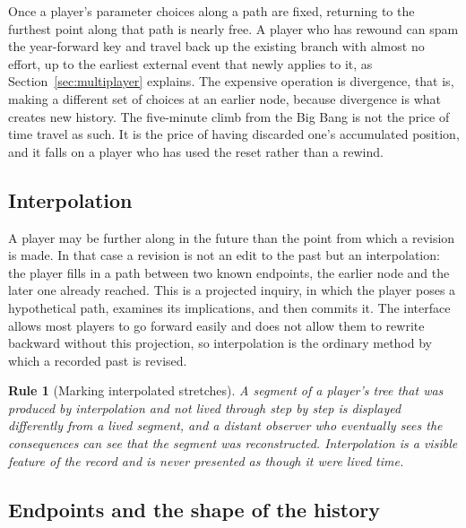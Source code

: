\documentclass[11pt]{article}
\newtheorem{designrule}{Rule}
\begin{document}
Once a player's parameter choices along a path are fixed, returning to the furthest point along that path is nearly free. A player who has rewound can spam the year-forward key and travel back up the existing branch with almost no effort, up to the earliest external event that newly applies to it, as Section~\ref{sec:multiplayer} explains. The expensive operation is divergence, that is, making a different set of choices at an earlier node, because divergence is what creates new history. The five-minute climb from the Big Bang is not the price of time travel as such. It is the price of having discarded one's accumulated position, and it falls on a player who has used the reset rather than a rewind.

\subsection{Interpolation}

A player may be further along in the future than the point from which a revision is made. In that case a revision is not an edit to the past but an interpolation: the player fills in a path between two known endpoints, the earlier node and the later one already reached. This is a projected inquiry, in which the player poses a hypothetical path, examines its implications, and then commits it. The interface allows most players to go forward easily and does not allow them to rewrite backward without this projection, so interpolation is the ordinary method by which a recorded past is revised.

\begin{designrule}[Marking interpolated stretches]
A segment of a player's tree that was produced by interpolation and not lived through step by step is displayed differently from a lived segment, and a distant observer who eventually sees the consequences can see that the segment was reconstructed. Interpolation is a visible feature of the record and is never presented as though it were lived time.
\end{designrule}

\subsection{Endpoints and the shape of the history}
\end{document}
